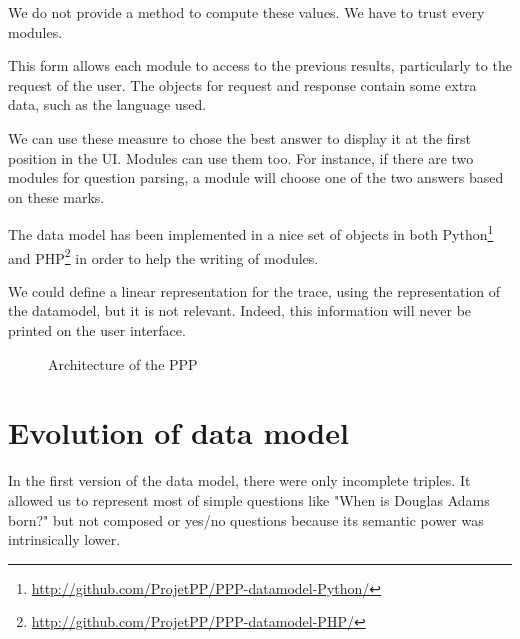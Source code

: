 We do not provide a method to compute these values. We have to trust every modules.

This form allows each module to access to the previous results, particularly to the request of the user. The objects for request and response contain some extra data, such as the language used.

We can use these measure to chose the best answer to display it at the first position in the UI. Modules can use them too. For instance, if there are two modules for question parsing, a module will choose one of the two answers based on these marks.

The data model has been implemented in a nice set of objects in both Python\footnote{\url{http://github.com/ProjetPP/PPP-datamodel-Python/}} and PHP\footnote{\url{http://github.com/ProjetPP/PPP-datamodel-PHP/}} in order to help the writing of modules.

We could define a linear representation for the trace, using the representation of the datamodel, but it is not relevant. Indeed, this information will never be printed on the user interface.

\begin{figure}[!ht]
    \centering
    \label{datamodel:struct}
    
    \caption{Architecture of the PPP}
\end{figure}

\FloatBarrier

\section{Evolution of data model}

In the first version of the data model, there were only incomplete triples. It allowed us to represent most of simple questions like "When is Douglas Adams born?" but not composed or yes/no questions because its semantic power was intrinsically lower.
